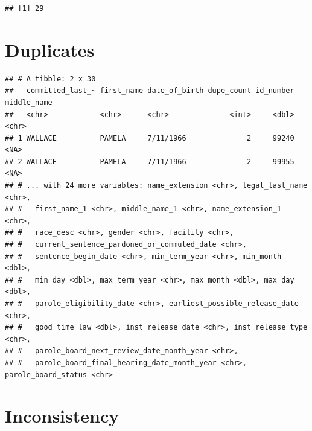 \documentclass[]{book}
\newenvironment{Shaded}{\begin{snugshade}}{\end{snugshade}}
\newcommand{\KeywordTok}[1]{\textcolor[rgb]{0.13,0.29,0.53}{\textbf{#1}}}
\newcommand{\NormalTok}[1]{#1}
\newcommand{\OperatorTok}[1]{\textcolor[rgb]{0.81,0.36,0.00}{\textbf{#1}}}
\newcommand{\StringTok}[1]{\textcolor[rgb]{0.31,0.60,0.02}{#1}}
\begin{document}
\begin{verbatim}
## [1] 29
\end{verbatim}

\begin{Shaded}
\end{Shaded}

\hypertarget{duplicates}{%
\section{Duplicates}\label{duplicates}}

\begin{Shaded}
\end{Shaded}

\begin{verbatim}
## # A tibble: 2 x 30
##   committed_last_~ first_name date_of_birth dupe_count id_number middle_name
##   <chr>            <chr>      <chr>              <int>     <dbl> <chr>      
## 1 WALLACE          PAMELA     7/11/1966              2     99240 <NA>       
## 2 WALLACE          PAMELA     7/11/1966              2     99955 <NA>       
## # ... with 24 more variables: name_extension <chr>, legal_last_name <chr>,
## #   first_name_1 <chr>, middle_name_1 <chr>, name_extension_1 <chr>,
## #   race_desc <chr>, gender <chr>, facility <chr>,
## #   current_sentence_pardoned_or_commuted_date <chr>,
## #   sentence_begin_date <chr>, min_term_year <chr>, min_month <dbl>,
## #   min_day <dbl>, max_term_year <chr>, max_month <dbl>, max_day <dbl>,
## #   parole_eligibility_date <chr>, earliest_possible_release_date <chr>,
## #   good_time_law <dbl>, inst_release_date <chr>, inst_release_type <chr>,
## #   parole_board_next_review_date_month_year <chr>,
## #   parole_board_final_hearing_date_month_year <chr>, parole_board_status <chr>
\end{verbatim}

\hypertarget{inconsistency}{%
\section{Inconsistency}\label{inconsistency}}
\end{document}

